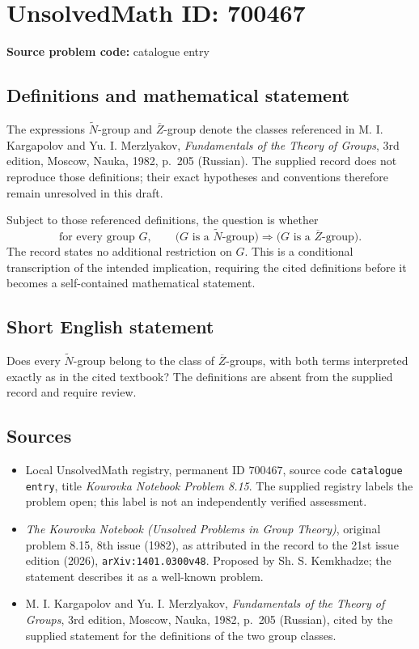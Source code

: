 \documentclass[11pt]{article}
\begin{document}
\section*{UnsolvedMath ID: 700467}
\textbf{Source problem code:} catalogue entry
\subsection{Definitions and mathematical statement}
The expressions \(\widetilde{N}\)-group and \(\overline{\! Z}\)-group denote the classes referenced in M. I. Kargapolov and Yu. I. Merzlyakov, \emph{Fundamentals of the Theory of Groups}, 3rd edition, Moscow, Nauka, 1982, p.~205 (Russian). The supplied record does not reproduce those definitions; their exact hypotheses and conventions therefore remain unresolved in this draft.

Subject to those referenced definitions, the question is whether
\[
\text{for every group }G,\qquad
\bigl(G\text{ is a }\widetilde{N}\text{-group}\bigr)
\Longrightarrow
\bigl(G\text{ is a }\overline{\! Z}\text{-group}\bigr).
\]
The record states no additional restriction on \(G\). This is a conditional transcription of the intended implication, requiring the cited definitions before it becomes a self-contained mathematical statement.
\subsection{Short English statement}
Does every \(\widetilde{N}\)-group belong to the class of \(\overline{\! Z}\)-groups, with both terms interpreted exactly as in the cited textbook? The definitions are absent from the supplied record and require review.
\subsection{Sources}
\begin{itemize}
\item Local UnsolvedMath registry, permanent ID \(700467\), source code \texttt{catalogue entry}, title \emph{Kourovka Notebook Problem 8.15}. The supplied registry labels the problem open; this label is not an independently verified assessment.
\item \emph{The Kourovka Notebook (Unsolved Problems in Group Theory)}, original problem 8.15, 8th issue (1982), as attributed in the record to the 21st issue edition (2026), \texttt{arXiv:1401.0300v48}. Proposed by Sh. S. Kemkhadze; the statement describes it as a well-known problem.
\item M. I. Kargapolov and Yu. I. Merzlyakov, \emph{Fundamentals of the Theory of Groups}, 3rd edition, Moscow, Nauka, 1982, p.~205 (Russian), cited by the supplied statement for the definitions of the two group classes.
\end{itemize}
\end{document}
